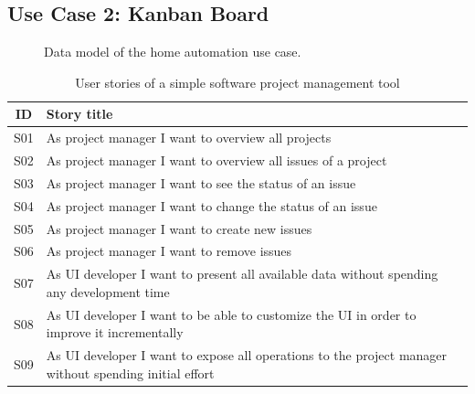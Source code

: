\subsection{Use Case 2: Kanban Board}\label{usecases}

\begin{figure}[!htb]
  \caption{\label{fig:my-label} Data model of the home automation use case.}
\end{figure}

\begin{table}
\begin{center}
\begin{tabular}{ |c|l| }
 \hline
 ID & Story title \\
 \hline
 S01 & As project manager I want to overview all projects \\
 S02 & As project manager I want to overview all issues of a project \\
 S03 & As project manager I want to see the status of an issue \\
 S04 & As project manager I want to change the status of an issue \\
 S05 & As project manager I want to create new issues \\
 S06 & As project manager I want to remove issues \\
 S07 & As UI developer I want to present all available data without spending any development time \\
 S08 & As UI developer I want to be able to customize the UI in order to improve it incrementally \\
 S09 & As UI developer I want to expose all operations to the project manager without spending initial effort \\
 \hline
\end{tabular}
\caption{User stories of a simple software project management tool}
\end{center}
\end{table}

